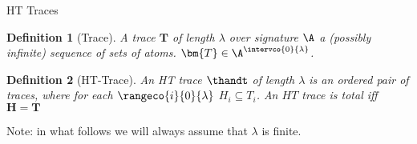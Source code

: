 \documentclass[aspectratio=169,xcolor=svgnames]{beamer}
\theoremstyle{theoremstyle_space}
\newtheorem{definition}{Definition}
\begin{document}
\begin{frame}[t]{HT Traces}

\begin{definition}[Trace]
  A trace $\bm{T}$ of length $\lambda$ over signature $\A$ a (possibly
  infinite) sequence of sets of atoms.
  $\bm{T} \in \A^{\intervco{0}{\lambda}}$.
\end{definition}

\begin{definition}[HT-Trace]
  An HT trace $\thandt$ of length $\lambda$ is an ordered pair of
  traces, where for each $\rangeco{i}{0}{\lambda}$
  $H_i \subseteq T_i$. An $HT$ trace is total iff $\bm{H} = \bm{T}$
\end{definition}

Note: in what follows we will always assume that $\lambda$ is
finite.

\end{frame}
\end{document}
